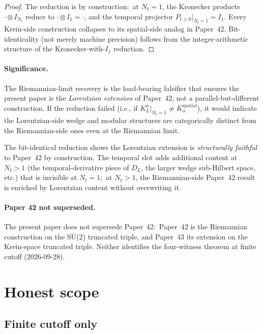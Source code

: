 \documentclass[11pt,a4paper]{article}
\theoremstyle{plain}
\theoremstyle{definition}
\newcommand{\Nt}{N_t}
\newcommand{\DL}{D_{L}}
\newcommand{\KL}{K_{L}}
\begin{document}
\begin{proof}
The reduction is by construction:\ at $\Nt = 1$, the Kronecker products
$\cdot \otimes I_{\Nt}$ reduce to $\cdot \otimes I_1 = \cdot$, and the
temporal projector $P_{t \ge 0}|_{\Nt = 1} = I_1$. Every Krein-side
construction collapses to its spatial-side analog in Paper~42.
Bit-identicality (not merely machine precision) follows from the
integer-arithmetic structure of the Kronecker-with-$I_1$ reduction.
\end{proof}

\paragraph{Significance.} The Riemannian-limit recovery is the
load-bearing falsifier that ensures the present paper is the
\emph{Lorentzian extension} of Paper~42, not a parallel-but-different
construction. If the reduction failed (i.e., if $\KL^\alpha|_{\Nt = 1}
\ne K_\alpha^{\mathrm{spatial}}$), it would indicate the Lorentzian-side
wedge and modular structures are categorically distinct from the
Riemannian-side ones even at the Riemannian limit.

The bit-identical reduction shows the Lorentzian extension is
\emph{structurally faithful} to Paper~42 by construction. The temporal
slot adds additional content at $\Nt > 1$ (the
temporal-derivative piece of $\DL$, the larger wedge sub-Hilbert
space, etc.) that is invisible at $\Nt = 1$;\ at $\Nt > 1$, the
Riemannian-side Paper~42 result is enriched by Lorentzian content
without overwriting it.

\paragraph{Paper 42 not superseded.} The present paper does not
supersede Paper~42:\ Paper~42 is the Riemannian construction on the
SU(2) truncated triple, and Paper~43 its extension on the Krein-space
truncated triple.  Neither identifies the four-witness theorem at
finite cutoff (2026-09-28).

\section{Honest scope}\label{sec:honest_scope}

\subsection{Finite cutoff only}\label{sec:scope_finite_cutoff}
\end{document}
